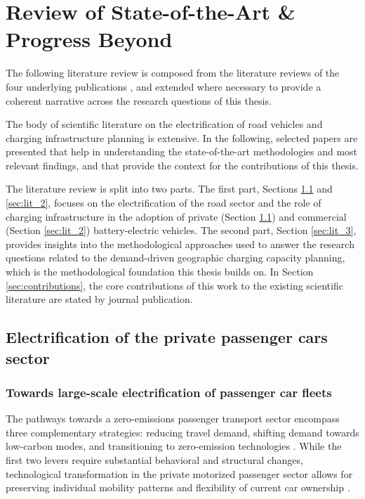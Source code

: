 \chapter{Review of State-of-the-Art \& Progress Beyond}\label{ch:stateoftheart}

The following literature review is composed from the literature reviews of the four underlying publications \citep{en15062147, GOLAB2026PublicCharger, GOLAB2026SpatialTruck, GOLAB2025134385}, and extended where necessary to provide a coherent narrative across the research questions of this thesis.

The body of scientific literature on the electrification of road vehicles and charging infrastructure planning is extensive. In the following, selected papers are presented that help in understanding the state-of-the-art methodologies and most relevant findings, and that provide the context for the contributions of this thesis.

The literature review is split into two parts. The first part, Sections \ref{sec:lit_1} and \ref{sec:lit_2}, focuses on the electrification of the road sector and the role of charging infrastructure in the adoption of private (Section \ref{sec:lit_1}) and commercial (Section \ref{sec:lit_2}) battery-electric vehicles. The second part, Section \ref{sec:lit_3}, provides insights into the methodological approaches used to answer the research questions related to the demand-driven geographic charging capacity planning, which is the methodological foundation this thesis builds on. In Section \ref{sec:contributions}, the core contributions of this work to the existing scientific literature are stated by journal publication.

    \section{Electrification of the private passenger cars sector} \label{sec:lit_1}
        \subsection{Towards large-scale electrification of passenger car fleets}

        The pathways towards a zero-emissions passenger transport sector encompass three complementary strategies: reducing travel demand, shifting demand towards low-carbon modes, and transitioning to zero-emission technologies \citep{Josefina, Milovanoff2021, Edelenbosch2017DecomposingTransport}. While the first two levers require substantial behavioral and structural changes, technological transformation in the private motorized passenger sector allows for preserving individual mobility patterns and flexibility of current car ownership \cite{Winkler2023}.

